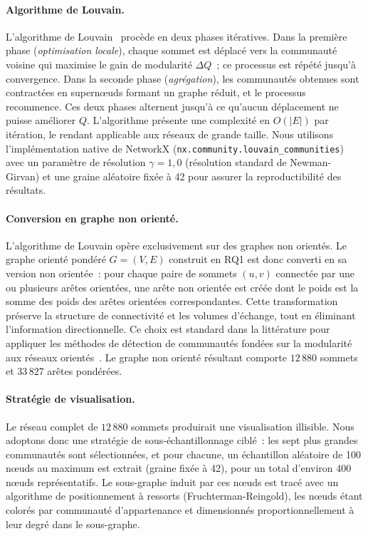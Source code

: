 \paragraph{Algorithme de Louvain.}
L'algorithme de Louvain~\cite{blondel2008louvain} proc\`ede en deux phases it\'eratives. Dans la premi\`ere phase (\textit{optimisation locale}), chaque sommet est d\'eplac\'e vers la communaut\'e voisine qui maximise le gain de modularit\'e $\Delta Q$~; ce processus est r\'ep\'et\'e jusqu'\`a convergence. Dans la seconde phase (\textit{agr\'egation}), les communaut\'es obtenues sont contract\'ees en supern\oe{}uds formant un graphe r\'eduit, et le processus recommence. Ces deux phases alternent jusqu'\`a ce qu'aucun d\'eplacement ne puisse am\'eliorer $Q$. L'algorithme pr\'esente une complexit\'e en $O(|E|)$ par it\'eration, le rendant applicable aux r\'eseaux de grande taille. Nous utilisons l'impl\'ementation native de NetworkX (\texttt{nx.community.louvain\_communities}) avec un param\`etre de r\'esolution $\gamma = 1{,}0$ (r\'esolution standard de Newman-Girvan) et une graine al\'eatoire fix\'ee \`a 42 pour assurer la reproductibilit\'e des r\'esultats.

\paragraph{Conversion en graphe non orient\'e.}
L'algorithme de Louvain op\`ere exclusivement sur des graphes non orient\'es. Le graphe orient\'e pond\'er\'e $G = (V, E)$ construit en RQ1 est donc converti en sa version non orient\'ee~: pour chaque paire de sommets $(u, v)$ connect\'ee par une ou plusieurs ar\^etes orient\'ees, une ar\^ete non orient\'ee est cr\'e\'ee dont le poids est la somme des poids des ar\^etes orient\'ees correspondantes. Cette transformation pr\'eserve la structure de connectivit\'e et les volumes d'\'echange, tout en \'eliminant l'information directionnelle. Ce choix est standard dans la litt\'erature pour appliquer les m\'ethodes de d\'etection de communaut\'es fond\'ees sur la modularit\'e aux r\'eseaux orient\'es~\cite{newman2018networks}. Le graphe non orient\'e r\'esultant comporte $12\,880$ sommets et $33\,827$ ar\^etes pond\'er\'ees.

\paragraph{Strat\'egie de visualisation.}
Le r\'eseau complet de $12\,880$ sommets produirait une visualisation illisible. Nous adoptons donc une strat\'egie de sous-\'echantillonnage cibl\'e~: les sept plus grandes communaut\'es sont s\'electionn\'ees, et pour chacune, un \'echantillon al\'eatoire de 100 n\oe{}uds au maximum est extrait (graine fix\'ee \`a 42), pour un total d'environ 400 n\oe{}uds repr\'esentatifs. Le sous-graphe induit par ces n\oe{}uds est trac\'e avec un algorithme de positionnement \`a ressorts (Fruchterman-Reingold), les n\oe{}uds \'etant color\'es par communaut\'e d'appartenance et dimensionn\'es proportionnellement \`a leur degr\'e dans le sous-graphe.

